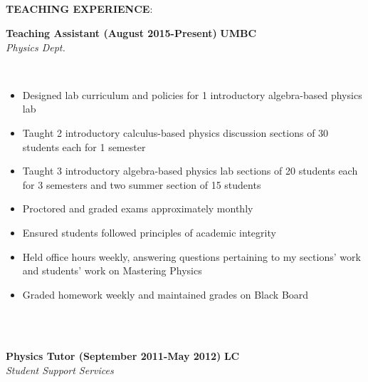 \documentclass{article}
\begin{document}
\phantom \\
\phantom \\
%
%
%
%
\par
\phantom \\
\phantom \\
\noindent \textbf{TEACHING EXPERIENCE}:\\
\begin{vwcol}[widths={0.8,0.2}, sep=.8cm, justify=flush, rule=0pt, indent=0em]
\noindent \textbf{Teaching Assistant (August 2015-Present)}
\newpage
\noindent \textbf{UMBC}\\
\noindent \emph{Physics Dept.}
\end{vwcol}
\phantom \\
\begin{itemize}
\item Designed lab curriculum and policies for 1 introductory algebra-based physics lab
\item Taught 2 introductory calculus-based physics discussion sections of 30 students each for 1 semester
\item Taught 3 introductory algebra-based physics lab sections of 20 students each for 3 semesters and two summer section of 15 students
\item Proctored and graded exams approximately monthly
\item Ensured students followed principles of academic integrity
\item Held office hours weekly, answering questions pertaining to my sections’ work and students’ work on Mastering Physics
\item Graded homework weekly and maintained grades on Black Board
\end{itemize}
\phantom \\
\phantom \\
%
%
%
%
\begin{vwcol}[widths={0.8,0.2}, sep=.8cm, justify=flush, rule=0pt, indent=0em]
\noindent \textbf{Physics Tutor (September 2011-May 2012)}
\newpage
\noindent \textbf{LC}\\
\noindent \emph{Student Support Services}
\end{vwcol}
\end{document}
